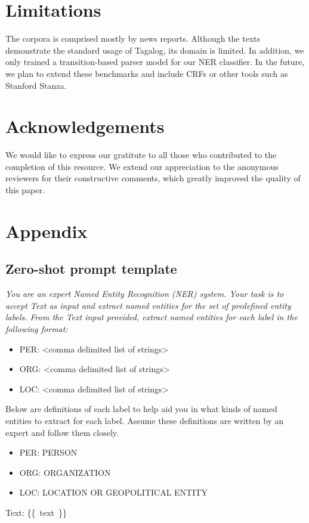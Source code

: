 \documentclass[11pt]{article}
\begin{document}
\section*{Limitations}

The \tlunified{} corpora is comprised mostly by news reports.
Although the texts demonstrate the standard usage of Tagalog, its domain is limited.
In addition, we only trained a transition-based parser model for our NER classifier.
In the future, we plan to extend these benchmarks and include CRFs or other tools such as Stanford Stanza.

\section*{Acknowledgements}

We would like to express our gratitute to all those who contributed to the completion of this resource.
We extend our appreciation to the anonymous reviewers for their constructive comments, which greatly improved the quality of this paper.




\appendix

\section{Appendix}

\subsection{Zero-shot prompt template}
\label{appendix:prompt}

{
\itshape
You are an expert Named Entity Recognition
(NER) system. Your task is to accept Text as
input and extract named entities for the set
of predefined entity labels. From the Text
input provided, extract named entities for
each label in the following format:

\begin{itemize}[noitemsep,topsep=0pt]
\item PER: <comma delimited list of strings>
\item ORG: <comma delimited list of strings>
\item LOC: <comma delimited list of strings>
\end{itemize}

Below are definitions of each label to help
aid you in what kinds of named entities to
extract for each label. Assume these
definitions are written by an expert and
follow them closely.

\begin{itemize}[noitemsep,topsep=0pt]
\item PER: PERSON
\item ORG: ORGANIZATION
\item LOC: LOCATION OR GEOPOLITICAL ENTITY
\end{itemize}

Text: \{\{~text~\}\}
}
\end{document}
